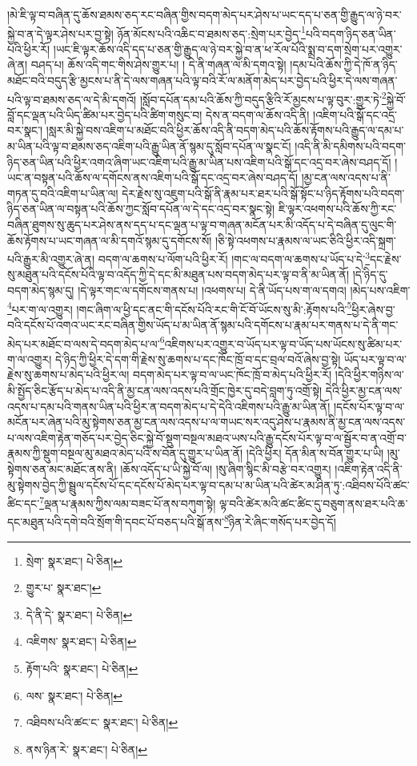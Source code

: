 །མེ་ཇི་ལྟ་བ་བཞིན་དུ་ཆོས་ཐམས་ཅད་རང་བཞིན་གྱིས་བདག་མེད་པར་ཤེས་པ་ཡང་དད་པ་ཅན་གྱི་རྒྱུད་ལ་ཉེ་བར་སྐྱེ་བ་ན་དེ་ལྟར་ཤེས་པར་བྱ་སྟེ། ཉོན་མོངས་པའི་འཆིང་བ་ཐམས་ཅད་:སྲེག་པར་བྱེད་\footnote{སྲེག་  སྣར་ཐང་།  པེ་ཅིན། }པའི་བདག་ཉིད་ཅན་ཡིན་པའི་ཕྱིར་རོ། །ཡང་ཇི་ལྟར་ཆོས་འདི་དད་པ་ཅན་གྱི་རྒྱུད་ལ་ཉེ་བར་སྐྱེ་བ་ན་ཕ་རོལ་པོའི་སྨྲ་བ་དག་སྲེག་པར་འགྱུར་ཞེ་ན། བཤད་པ། ཆོས་འདི་གང་གིས་ཤེས་གྱུར་པ། །
དེ་ནི་གཞན་ལ་མི་དགའ་སྟེ། །དམ་པའི་ཆོས་ཀྱི་དེ་ཁོ་ན་ཉིད་མཐོང་བའི་བདུད་རྩི་མྱངས་པ་ནི་དེ་ལས་གཞན་པའི་ལྟ་བའི་རོ་ལ་མནོག་མེད་པར་བྱེད་པའི་ཕྱིར་དེ་ལས་གཞན་པའི་ལྟ་བ་ཐམས་ཅད་ལ་དེ་མི་དགའོ། །སློབ་དཔོན་དམ་པའི་ཆོས་ཀྱི་བདུད་རྩིའི་རོ་མྱངས་པ་ལྟ་བུར་:གྱུར་ཏེ་\footnote{གྱུར་པ་  སྣར་ཐང་། }སྐྱེ་བོ་བློ་དང་ལྡན་པའི་ཡིད་ཚིམ་པར་བྱེད་པའི་ཚིག་གསུང་བ། དེས་ན་བདག་ལ་ཆོས་འདི་ནི། །འཇིག་པའི་སྒོ་དང་འདྲ་བར་སྣང་། །སླར་མི་སྐྱེ་བས་འཇིག་པ་མཐོང་བའི་ཕྱིར་ཆོས་འདི་ནི་བདག་མེད་པའི་ཆོས་རྟོགས་པའི་རྒྱུད་ལ་དམ་པ་མ་ཡིན་པའི་ལྟ་བ་ཐམས་ཅད་འཇིག་པའི་རྒྱུ་ཡིན་ནོ་སྙམ་དུ་སློབ་དཔོན་ལ་སྣང་ངོ། །འདི་ནི་མི་དམིགས་པའི་བདག་ཉིད་ཅན་ཡིན་པའི་ཕྱིར་འགའ་ཞིག་ཡང་འཇིག་པའི་རྒྱུ་མ་ཡིན་པས་འཇིག་པའི་སྒོ་དང་འདྲ་བར་ཞེས་བཤད་དོ། །ཡང་ན་བསྟན་པའི་ཆོས་ལ་དགོངས་ནས་འཇིག་པའི་སྒོ་དང་འདྲ་བར་ཞེས་བཤད་དོ། །མྱ་ངན་ལས་འདས་པ་ནི་གཏན་དུ་བའི་འཇིག་པ་ཡིན་ལ། དེར་རྗེས་སུ་འཇུག་པའི་སྒོ་ནི་རྣམ་པར་ཐར་པའི་སྒོ་སྟོང་པ་ཉིད་རྟོགས་པའི་བདག་ཉིད་ཅན་ཡིན་ལ་བསྟན་པའི་ཆོས་ཀྱང་སློབ་དཔོན་ལ་དེ་དང་འདྲ་བར་སྣང་སྟེ། ཇི་ལྟར་འཕགས་པའི་ཆོས་ཀྱི་རང་བཞིན་ཐུགས་སུ་ཆུད་པར་ཤེས་ནས་དད་པ་དང་ལྡན་པ་ལྟ་བ་གཞན་མངོན་པར་མི་འདོད་པ་དེ་བཞིན་དུ་ལུང་གི་ཆོས་རྟོགས་པ་ཡང་གཞན་ལ་མི་དགའོ་སྙམ་དུ་དགོངས་སོ། །ཅི་སྟེ་འཕགས་པ་རྣམས་ལ་ཡང་ཅིའི་ཕྱིར་འདི་སྐྲག་པའི་རྒྱུར་མི་འགྱུར་ཞེ་ན། བདག་ལ་ཆགས་པ་ལོག་པའི་ཕྱིར་རོ། །གང་ལ་བདག་ལ་ཆགས་པ་ཡོད་པ་དེ་\footnote{དེ་ནི་དེ་  སྣར་ཐང་།  པེ་ཅིན། }དང་རྗེས་སུ་མཐུན་པའི་དངོས་པོའི་ལྟ་བ་འདོད་ཀྱི་དེ་དང་མི་མཐུན་པས་བདག་མེད་པར་ལྟ་བ་ནི་མ་ཡིན་ནོ། །དེ་ཉིད་དུ་བདག་མེད་སྙམ་དུ། །དེ་ལྟར་གང་ལ་དགོངས་གནས་པ། །འཕགས་པ། དེ་ནི་ཡོད་པས་ག་ལ་དགའ། །མེད་པས་འཇིག་\footnote{འཇིགས་  སྣར་ཐང་།  པེ་ཅིན། }པར་ག་ལ་འགྱུར། །གང་ཞིག་ལ་ཕྱི་དང་ནང་གི་དངོས་པོའི་རང་གི་ངོ་བོ་ཡོངས་སུ་མི་:རྟོགས་པའི་\footnote{རྟོག་པའི་  སྣར་ཐང་།  པེ་ཅིན། }ཕྱིར་ཞེས་བྱ་བའི་དངོས་པོ་འགའ་ཡང་རང་བཞིན་གྱིས་ཡོད་པ་མ་ཡིན་ནོ་སྙམ་པའི་དགོངས་པ་རྣམ་པར་གནས་པ་དེ་ནི་གང་མེད་པར་མཐོང་བ་ལས་དེ་བདག་མེད་པ་ལ་\footnote{ལས་  སྣར་ཐང་།  པེ་ཅིན། }འཇིགས་པར་འགྱུར་བ་ཡོད་པར་ལྟ་བ་ཡོད་པས་ཡོངས་སུ་ཚིམ་པར་ག་ལ་འགྱུར། དེ་ཉིད་ཀྱི་ཕྱིར་དེ་དག་གི་རྗེས་སུ་ཆགས་པ་དང་ཁོང་ཁྲོ་བ་དང་བྲལ་བའོ་ཞེས་བྱ་སྟེ། ཡོད་པར་ལྟ་བ་ལ་རྗེས་སུ་ཆགས་པ་མེད་པའི་ཕྱིར་ལ། བདག་མེད་པར་ལྟ་བ་ལ་ཡང་ཁོང་ཁྲོ་བ་མེད་པའི་ཕྱིར་རོ། །དེའི་ཕྱིར་གཉིས་ལ་མི་སྤྱོད་ཅིང་རྩོད་པ་མེད་པ་འདི་ནི་མྱ་ངན་ལས་འདས་པའི་གྲོང་ཁྱེར་དུ་བདེ་བླག་ཏུ་འགྲོ་སྟེ། དེའི་ཕྱིར་མྱ་ངན་ལས་འདས་པ་དམ་པའི་གནས་ཡིན་པའི་ཕྱིར་ན་བདག་མེད་པ་དེ་དེའི་འཇིགས་པའི་རྒྱུ་མ་ཡིན་ནོ། །དངོས་པོར་ལྟ་བ་ལ་མངོན་པར་ཞེན་པའི་མུ་སྟེགས་ཅན་མྱ་ངན་ལས་འདས་པ་ལ་གཡང་སར་འདུ་ཤེས་པ་རྣམས་ནི་མྱ་ངན་ལས་འདས་པ་ལས་འཇིག་རྟེན་གཅོད་པར་བྱེད་ཅིང་སྐྱེ་བོ་སྡུག་བསྔལ་མཐའ་ཡས་པའི་རྒྱུ་དངོས་པོར་ལྟ་བ་ལ་སྦྱོར་བ་ན་འགྲོ་བ་རྣམས་ཀྱི་སྡུག་བསྔལ་མུ་མཐའ་མེད་པའི་ས་བོན་དུ་གྱུར་པ་ཡིན་ནོ། །དེའི་ཕྱིར། དོན་མིན་ས་བོན་གྱུར་པ་ཡི། །མུ་སྟེགས་ཅན་མང་མཐོང་ནས་ནི། །ཆོས་འདོད་པ་ཡི་སྐྱེ་བོ་ལ། །སུ་ཞིག་སྙིང་མི་བརྩེ་བར་འགྱུར། །འཇིག་རྟེན་འདི་ནི་མུ་སྟེགས་བྱེད་ཀྱི་སྦྲུལ་དངོས་པོ་དང་དངོས་པོ་མེད་པར་ལྟ་བ་དམ་པ་མ་ཡིན་པའི་ཚེར་མ་ཤིན་ཏུ་:འཐིབས་པོའི་ཚང་ཚིང་དང་\footnote{འཐིབས་པའི་ཚང་ང་  སྣར་ཐང་།  པེ་ཅིན། }ལྡན་པ་རྣམས་ཀྱིས་ལམ་བཟང་པོ་ནས་བཀུག་སྟེ། ལྟ་བའི་ཚེར་མའི་ཚང་ཚིང་དུ་བཅུག་ནས་ཐར་པའི་ཆ་དང་མཐུན་པའི་དགེ་བའི་སྲོག་གི་དབང་པོ་བཅད་པའི་སྒོ་ནས་\footnote{ནས་ཉིན་རེ་  སྣར་ཐང་།  པེ་ཅིན། }ཉིན་རེ་ཞིང་གསོད་པར་བྱེད་དོ། 